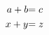 \documentclass[12pt,border=2pt,preview]{standalone}
\begin{document}
\begin{align*}
{\color{black}a+b }&{\color{black}= c }\\
{\color{black}x+y }&{\color{black}= z}
\end{align*}
\end{document}
